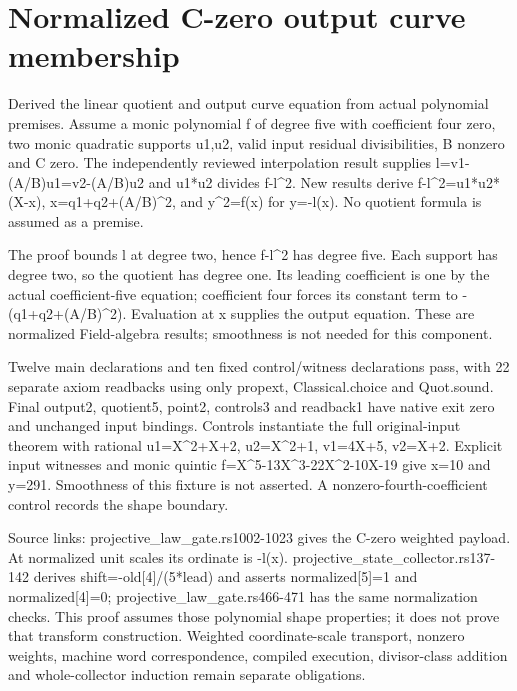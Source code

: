 \documentclass[11pt]{article}
\begin{document}
\sloppy
\section*{Normalized C-zero output curve membership}
Derived the linear quotient and output curve equation from actual polynomial premises. Assume a monic polynomial f of degree five with coefficient four zero, two monic quadratic supports u1,u2, valid input residual divisibilities, B nonzero and C zero. The independently reviewed interpolation result supplies l=v1-(A/B)u1=v2-(A/B)u2 and u1*u2 divides f-l\textasciicircum{}2. New results derive f-l\textasciicircum{}2=u1*u2*(X-x), x=q1+q2+(A/B)\textasciicircum{}2, and y\textasciicircum{}2=f(x) for y=-l(x). No quotient formula is assumed as a premise.\par\medskip
The proof bounds l at degree two, hence f-l\textasciicircum{}2 has degree five. Each support has degree two, so the quotient has degree one. Its leading coefficient is one by the actual coefficient-five equation; coefficient four forces its constant term to -(q1+q2+(A/B)\textasciicircum{}2). Evaluation at x supplies the output equation. These are normalized Field-algebra results; smoothness is not needed for this component.\par\medskip
Twelve main declarations and ten fixed control/witness declarations pass, with 22 separate axiom readbacks using only propext, Classical.choice and Quot.sound. Final output2, quotient5, point2, controls3 and readback1 have native exit zero and unchanged input bindings. Controls instantiate the full original-input theorem with rational u1=X\textasciicircum{}2+X+2, u2=X\textasciicircum{}2+1, v1=4X+5, v2=X+2. Explicit input witnesses and monic quintic f=X\textasciicircum{}5-13X\textasciicircum{}3-22X\textasciicircum{}2-10X-19 give x=10 and y=291. Smoothness of this fixture is not asserted. A nonzero-fourth-coefficient control records the shape boundary.\par\medskip
Source links: projective\_law\_gate.rs1002-1023 gives the C-zero weighted payload. At normalized unit scales its ordinate is -l(x). projective\_state\_collector.rs137-142 derives shift=-old[4]/(5*lead) and asserts normalized[5]=1 and normalized[4]=0; projective\_law\_gate.rs466-471 has the same normalization checks. This proof assumes those polynomial shape properties; it does not prove that transform construction. Weighted coordinate-scale transport, nonzero weights, machine word correspondence, compiled execution, divisor-class addition and whole-collector induction remain separate obligations.\par\medskip
\end{document}
